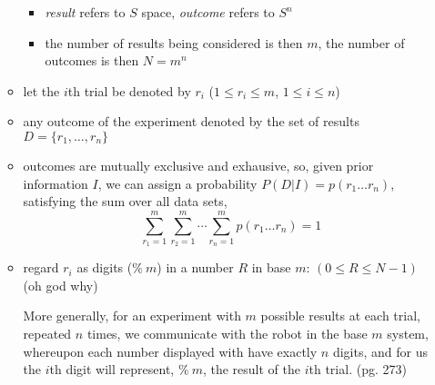 \documentclass[../jaynes_prob_theory_notes.tex]{subfiles}
\begin{document}
\begin{itemize}
\begin{itemize}
                            \begin{itemize}
                                \item \textit{result} refers to $S$ space, \textit{outcome} refers to $S^n$
                                \item the number of results being considered is then $m$, the number of outcomes is then $N=m^n$
                            \end{itemize}
                        \item let the $i$th trial be denoted by $r_i$ ($1 \leq r_i \leq m$, $1 \leq i \leq n$)
                        \item any outcome of the experiment denoted by the set of results $D = \{r_1, \ldots, r_n\}$
                        \item outcomes are mutually exclusive and exhausive, so, given prior information $I$, we can assign a probability $P(D|I) = p(r_1 \ldots r_n)$, satisfying the sum over all data sets,
                            \begin{equation*}
                                \sum\limits^{m}_{r_1=1} \sum\limits^{m}_{r_2=1} \cdots \sum\limits^{m}_{r_n=1} p(r_1 \ldots r_n) = 1
                            \end{equation*}
                        \item regard $r_i$ as digits ($\%~m$) in a number $R$ in base $m$: $(0 \leq R \leq N-1)$ (oh god why)
                            \begin{displayquote}
                                More generally, for an experiment with $m$ possible results at each trial, repeated $n$ times, we communicate with the robot in the base $m$ system, whereupon each number displayed with have exactly $n$ digits, and for us the $i$th digit will represent, $\%~m$, the result of the $i$th trial. (pg. 273)
                            \end{displayquote}
                \end{itemize}
            \end{itemize}
\end{document}
